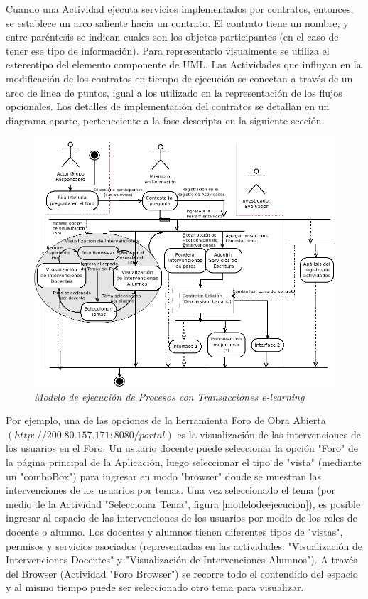 Cuando una Actividad ejecuta servicios implementados por contratos, entonces, se
establece un arco saliente hacia un contrato. El contrato tiene un nombre, y
entre paréntesis se indican cuales son los objetos participantes (en el caso de
tener ese tipo de información). Para representarlo visualmente se utiliza el
estereotipo del elemento componente de UML. Las Actividades que influyan en la
modificación de los contratos en tiempo de ejecución se conectan a través de un
arco de linea de puntos, igual a los utilizado en la representación de los
flujos opcionales. Los detalles de implementación del contratos se detallan en
un diagrama aparte, perteneciente a la fase descripta en la siguiente sección.

	\begin{figure}[!h]
        \begin{center}

	\includegraphics[width=5 in,totalheight=4 in]{Ch7/proceso11.png}
    \caption{\small \sl Modelo de ejecución de Procesos con Transacciones e-learning} \label{modelodeejecucion7}
         \end{center}
         \end{figure}


Por ejemplo, una de las opciones de la herramienta Foro de Obra Abierta
$(http://200.80.157.171:8080/portal)$ es la visualización de las intervenciones
de los usuarios en el Foro. Un usuario docente puede seleccionar la opción
"Foro" de la página principal de la Aplicación, luego seleccionar el tipo de
"vista" (mediante un "comboBox") para ingresar en modo "browser" donde se
muestran las intervenciones de los usuarios por temas. Una vez seleccionado el
tema (por medio de la Actividad "Seleccionar Tema", figura
\ref{modelodeejecucion}), es posible ingresar al espacio de las intervenciones
de los usuarios por medio de los roles de docente o alumno. Los docentes y
alumnos tienen diferentes tipos de "vistas", permisos y servicios asociados
(representadas en las actividades: "Visualización de Intervenciones Docentes" y
"Visualización de Intervenciones Alumnos"). A  través del Browser (Actividad
"Foro Browser") se recorre todo el contendido del espacio y al mismo tiempo
puede ser seleccionado otro tema para visualizar.

